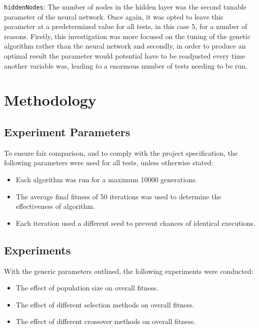 		\texttt{hiddenNodes}: The number of nodes in the hidden layer was the second tunable parameter of the neural network. Once again, it was opted to leave this parameter at a predetermined value for all tests, in this case 5, for a number of reasons. Firstly, this investigation was more focused on the tuning of the genetic algorithm rather than the neural network and secondly, in order to produce an optimal result the parameter would potential have to be readjusted every time another variable was, leading to a enormous number of tests needing to be run.
		
		
\section{Methodology}
	\subsection{Experiment Parameters}
		To ensure fair comparison, and to comply with the project specification, the following parameters were used for all tests, unless otherwise stated:
		\begin{itemize}
			\item Each algorithm was run for a maximum 10000 generations.
			\item The average final fitness of 50 iterations was used to determine the effectiveness of algorithm.
			\item Each iteration used a different seed to prevent chances of identical executions.
		\end{itemize}
	
	\subsection{Experiments}
		With the generic parameters outlined, the following experiments were conducted:
		\begin{itemize}
			\item The effect of population size on overall fitness.
			\item The effect of different selection methods on overall fitness.
			\item The effect of different crossover methods on overall fitness.
		\end{itemize}
	
